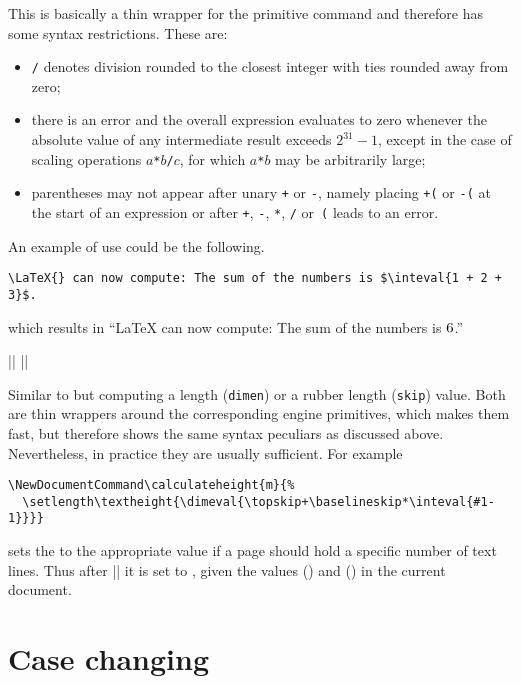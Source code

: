 \documentclass{ltxguide}
\begin{document}
  This is basically a thin wrapper for the primitive 
  command and therefore has some syntax restrictions. These are:
  \begin{itemize}
  \item \texttt{/} denotes division rounded to the closest integer with
    ties rounded away from zero;
  \item there is an error and the overall expression evaluates to zero
    whenever the absolute value of any intermediate result exceeds
    $2^{31}-1$, except in the case of scaling operations
    $a$\texttt{*}$b$\texttt{/}$c$, for which $a$\texttt{*}$b$ may be
    arbitrarily large;
  \item parentheses may not appear after unary \texttt{+} or
    \texttt{-}, namely placing \texttt{+(} or \texttt{-(} at the start
    of an expression or after \texttt{+}, \texttt{-}, \texttt{*},
    \texttt{/} or~\texttt{(} leads to an error.
  \end{itemize}

An example of use could be the following.
\begin{verbatim}
\LaTeX{} can now compute: The sum of the numbers is $\inteval{1 + 2 + 3}$.
\end{verbatim}
which results in
\enquote{\LaTeX{} can now compute: The sum of the numbers is $\inteval{1 + 2 + 3}$.}


\begin{decl}
  |\dimeval|  \qquad
  |\skipeval| 
\end{decl}

Similar to  but computing a length (\texttt{dimen}) or a
rubber length (\texttt{skip}) value. Both are thin wrappers around
the corresponding engine primitives, which makes them fast, but
therefore shows the same syntax peculiars as discussed
above. Nevertheless, in practice they are usually sufficient.  For
example
\begin{verbatim}
\NewDocumentCommand\calculateheight{m}{%
  \setlength\textheight{\dimeval{\topskip+\baselineskip*\inteval{#1-1}}}}
\end{verbatim}
sets the  to the appropriate value if a page should
hold a specific number of text lines. Thus after ||
it is set to , given
the values  (\dimeval{\topskip}) and 
(\dimeval{\baselineskip}) in the current document.

\section{Case changing}
\end{document}
